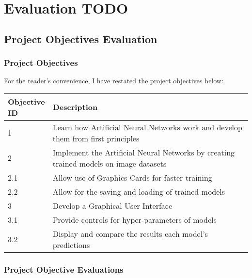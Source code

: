\documentclass[./project-report/src/latex/project-report.tex]{subfiles}
\begin{document}
\maketitle

\section{Evaluation TODO}

\subsection{Project Objectives Evaluation}

\subsubsection{Project Objectives}

For the reader's convenience, I have restated the project objectives below:
\vspace{5mm}

\noindent\begin{tabular}{|p{0.13\linewidth}|p{0.87\linewidth}|}
    \hline
    \textbf{Objective ID} & \textbf{Description} \\
    \hline
    1 & Learn how Artificial Neural Networks work and develop them from first principles \\
    \hline
    2 & Implement the Artificial Neural Networks by creating trained models on image datasets \\
    \hline
    2.1 & Allow use of Graphics Cards for faster training \\
    \hline
    2.2 & Allow for the saving and loading of trained models \\
    \hline
    3 & Develop a Graphical User Interface \\
    \hline
    3.1 & Provide controls for hyper-parameters of models \\
    \hline
    3.2 & Display and compare the results each model's predictions \\
    \hline
\end{tabular}

\subsubsection{Project Objective Evaluations}
\end{document}

